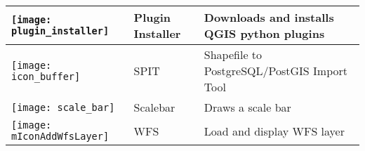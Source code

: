 \begin{minipage}{\textwidth}
\begin{table}[H]
\begin{tabular}{|l|l|p{4in}|}
\hline
\texttt{[image: plugin\_installer]}
 & Plugin Installer \index{plugins!Plugin Installer} & Downloads and installs QGIS python plugins\\
\hline
\texttt{[image: icon\_buffer]}
 & SPIT \index{plugins!spit}& Shapefile to PostgreSQL/PostGIS Import Tool \\
\hline
\texttt{[image: scale\_bar]}
 & Scalebar \index{plugins!scalebar}& Draws a scale bar\\
\hline
\texttt{[image: mIconAddWfsLayer]}
 & WFS & Load and display WFS layer \\
\hline
\end{tabular}
\end{table}
\end{minipage}

\normalsize


\begin{Tip}\caption{\textsc{Plugins Settings Saved to Project}}
\end{Tip}
